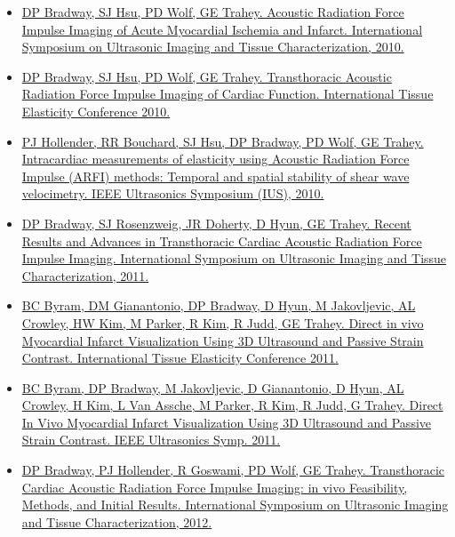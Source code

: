 \documentclass[letterpaper,10pt,english]{sphinxmanual}
\begin{document}
\begin{itemize}
\item {} 
\href{http://uitc-symposium.org/2010\_abstracts.pdf}{DP Bradway, SJ Hsu, PD Wolf, GE Trahey. Acoustic Radiation Force
Impulse Imaging of Acute Myocardial Ischemia and Infarct.
International Symposium on Ultrasonic Imaging and Tissue
Characterization,
2010.}

\item {} 
\href{http://www.elasticityconference.org/prior\_conf/2010/PDF/2010Proceedings.pdf}{DP Bradway, SJ Hsu, PD Wolf, GE Trahey. Transthoracic Acoustic
Radiation Force Impulse Imaging of Cardiac Function. International
Tissue Elasticity Conference
2010.}

\item {} 
\href{http://dx.doi.org/10.1109/ULTSYM.2010.5935946}{PJ Hollender, RR Bouchard, SJ Hsu, DP Bradway, PD Wolf, GE Trahey.
Intracardiac measurements of elasticity using Acoustic Radiation
Force Impulse (ARFI) methods: Temporal and spatial stability of shear
wave velocimetry. IEEE Ultrasonics Symposium (IUS),
2010.}

\item {} 
\href{http://www.elasticityconference.org/prior\_conf/2011/PDF/2011ITECProceedings.pdf}{DP Bradway, SJ Rosenzweig, JR Doherty, D Hyun, GE Trahey. Recent
Results and Advances in Transthoracic Cardiac Acoustic Radiation
Force Impulse Imaging. International Symposium on Ultrasonic Imaging
and Tissue Characterization,
2011.}

\item {} 
\href{http://www.elasticityconference.org/prior\_conf/2011/PDF/2011ITECProceedings.pdf}{BC Byram, DM Gianantonio, DP Bradway, D Hyun, M Jakovljevic, AL
Crowley, HW Kim, M Parker, R Kim, R Judd, GE Trahey. Direct in vivo
Myocardial Infarct Visualization Using 3D Ultrasound and Passive
Strain Contrast. International Tissue Elasticity Conference
2011.}

\item {} 
\href{http://dx.doi.org/10.1109/ULTSYM.2011.0007}{BC Byram, DP Bradway, M Jakovljevic, D Gianantonio, D Hyun, AL
Crowley, H Kim, L Van Assche, M Parker, R Kim, R Judd, G Trahey.
Direct In Vivo Myocardial Infarct Visualization Using 3D Ultrasound
and Passive Strain Contrast. IEEE Ultrasonics Symp.
2011.}

\item {} 
\href{http://uitc-symposium.org/2012\_abstracts.pdf}{DP Bradway, PJ Hollender, R Goswami, PD Wolf, GE Trahey.
Transthoracic Cardiac Acoustic Radiation Force Impulse Imaging: in
vivo Feasibility, Methods, and Initial Results. International
Symposium on Ultrasonic Imaging and Tissue Characterization,
2012.}


\end{itemize}
\end{document}
